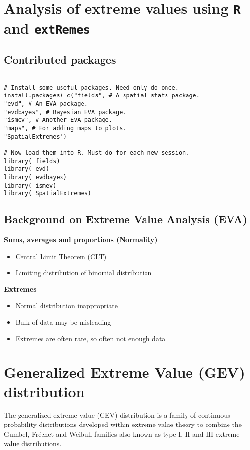\documentclass[]{article}
\begin{document}
\tableofcontents

\section{Analysis of extreme values using \texttt{R} and \texttt{extRemes} }

\subsection{Contributed packages}
\begin{framed}
\begin{verbatim}

# Install some useful packages. Need only do once.
install.packages( c("fields", # A spatial stats package.
"evd", # An EVA package.
"evdbayes", # Bayesian EVA package.
"ismev", # Another EVA package.
"maps", # For adding maps to plots.
"SpatialExtremes")

# Now load them into R. Must do for each new session.
library( fields)
library( evd)
library( evdbayes)
library( ismev)
library( SpatialExtremes)
\end{verbatim}
\end{framed}

\subsection{Background on Extreme Value Analysis (EVA)}
\textbf{Sums, averages and proportions (Normality)}
\begin{itemize}
\item Central Limit Theorem (CLT)
\item Limiting distribution of binomial distribution
\end{itemize}
\textbf{Extremes}
\begin{itemize}
\item Normal distribution inappropriate
\item Bulk of data may be misleading
\item Extremes are often rare, so often not enough data
\end{itemize}

\newpage
\section{Generalized Extreme Value (GEV) distribution}
The generalized extreme value (GEV) distribution is a family of continuous probability distributions developed within extreme value theory to combine the Gumbel, Fréchet and Weibull families also known as type I, II and III extreme value distributions. 
\end{document}
